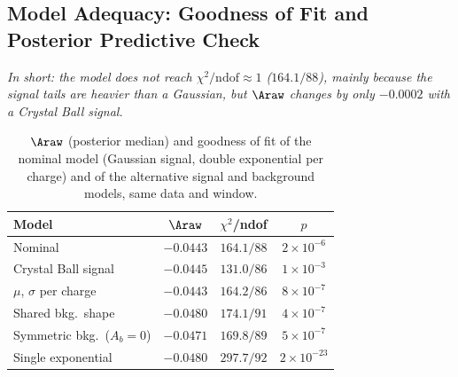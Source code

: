 \subsection{Model Adequacy: Goodness of Fit and Posterior Predictive Check}
\label{sec:bayes_gof}
\emph{In short: the model does not reach $\chi^2/\mathrm{ndof}\approx1$ ($164.1/88$), mainly because the signal tails are heavier than a Gaussian, but $\Araw$ changes by only $-0.0002$ with a Crystal Ball signal.}
\begin{table}[!t]
\centering
\begin{tabular}{lccc}
\toprule
Model & $\Araw$ & $\chi^2$/ndof & $p$ \\
\midrule
Nominal & $-0.0443$ & $164.1/88$ & $2\times10^{-6}$ \\
Crystal Ball signal & $-0.0445$ & $131.0/86$ & $1\times10^{-3}$ \\
$\mu$, $\sigma$ per charge & $-0.0443$ & $164.2/86$ & $8\times10^{-7}$ \\
Shared bkg.\ shape & $-0.0480$ & $174.1/91$ & $4\times10^{-7}$ \\
Symmetric bkg.\ ($A_b=0$) & $-0.0471$ & $169.8/89$ & $5\times10^{-7}$ \\
Single exponential & $-0.0480$ & $297.7/92$ & $2\times10^{-23}$ \\
\bottomrule
\end{tabular}
\caption{$\Araw$ (posterior median) and goodness of fit of the nominal model (Gaussian signal, double exponential per charge) and of the alternative signal and background models, same data and window.}
\label{tab:gof}
\end{table}


